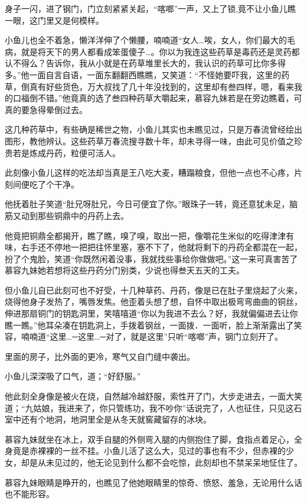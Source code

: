 \documentclass[12pt,oneside]{book}
\begin{document}
身子一闪，进了钢门，门立刻紧紧关起，``喀啷''一声，又上了锁,竟不让小鱼儿瞧一眼，这门里又是何模样。

小鱼儿也全不着急，懒洋洋伸了个懒腰，喃喃道``女人\ldots 唉，女人，你们最大的毛病，就是将天下的男人都看成笨蛋傻子\ldots。你以为我连这些药草是毒药还是灵药都认不得么？告诉你，我从小就是在药草堆里长大的，我认识的药草可比你多得多。''他一面自言自语，一面东翻翻西瞧瞧，又笑道：``不怪她要吓我，这里的药草，倒真有好些货色，万大叔找了几十年没找到的，这里却有叁四样，嗯，看来我的口福倒不错。''他竟真的选了叁四种药草大嚼起来，慕容九妹若是在旁边瞧着，可真的要急得晕倒过去。

这几种药草中，有些确是稀世之物，小鱼儿其实也未瞧见过，只是万春流曾经绘出图形，教他辨认。这些药草万春流搜寻数十年，却未寻得一味，由此可见价值之珍贵若是炼成丹药，粒便可活人。

此刻像小鱼儿这样的吃法却当真是王八吃大麦，糟蹋粮食，但他一点也不心疼，片刻间便吃了个干净。

他抚着肚子笑道``肚兄呀肚兄，今日可便宜了你。''眼珠子一转，竟还意犹未足，脑筋又动到那些铜鼎中的丹药上去。

他竟把铜鼎全都揭开，瞧了瞧，嗅了嗅，取出一把，像嚼花生米似的吃得津津有味，右手还不停地一把把往怀里塞，塞不下了，他就将剩下的丹药全都混在一起，扮了个鬼脸，笑道``你既然闲着没事，我就找些事给你做做吧。''这一来可真害苦了慕容九妹她若想将这些丹药分门别类，少说也得叁天五天的工夫。

但小鱼儿自已此刻可也不好受，十几种草药、丹药，像是已在肚子里烧起了火来，烧得他身子发热了，嘴唇发焦。他歪着头想了想，自怀中取出极弯弯曲曲的铜丝，伸进那扇铜门的钥匙洞里，笑嘻嘻道``你以为我进不去么？好，我就偏偏进去让你瞧一瞧。''他耳朵凑在钥匙洞上，手拨着钢丝，一面拨．一面听，脸上渐渐露出了笑容，喃喃道``这里\ldots─这里\ldots─对了，就是这里''只听``喀啷''声，钢门立刻开了。

里面的房子，比外面的更冷，寒气又自门缝中袭出。

小鱼儿深深吸了口气，道；``好舒服。''

他此刻全身像是被火在烧，自然越冷越舒服，索性开了门，大步走进去，一面大笑道；``九姑娘，我进来了，你只管练功，我不吵你''话说完了，人也征住，只见这石室中还有个地洞，地洞里全是从冬天就窖藏留存的冰块。

慕容九妹就坐在冰上，双手自腿的外侧弯入腿的内侧抱住了脚，食指点着足心，全身竟是赤裸裸的一丝不挂。小鱼儿活了这么大，见过的事也有不少，但赤裸的少女，却是从未见过的，他无论见到什么都不会吃惊，此刻却也不禁呆呆地怔住了。

慕容九妹眼睛是睁开的，也瞧见了他她眼睛里的惊奇、愤怒、羞急，无论用什么话也不能形容。
\end{document}
